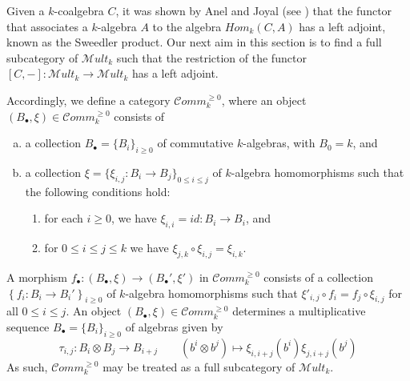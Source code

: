 \documentclass[10pt, colorlinks]{article}
\numberwithin{equation}{section} \DeclareMathSizes{2}{10}{12}{13}
\begin{document}
\smallskip


Given a $k$-coalgebra $C$, it was shown by Anel and Joyal (see \cite[Proposition 3.4.3]{AJ}) that the functor that associates a $k$-algebra $A$ to the algebra 
$Hom_k(C,A)$ has a left adjoint, known as the Sweedler product. Our next aim in this section is to find a full subcategory of $\mathscr Mult_k$ such that the restriction of the functor $[C,-]:\mathscr Mult_k\longrightarrow \mathscr Mult_k$ has a left adjoint.

\smallskip

Accordingly, we define a category $\mathcal Comm_k^{\geq 0}$, where an object $(B_\bullet,\xi)\in \mathcal Comm_k^{\geq 0}$ consists of 
\begin{enumerate}[(a)]
    \item a collection $B_\bullet=\{B_i\}_{i\geq 0}$ of commutative $k$-algebras, with $B_0=k$, and
    \item a collection $\xi=\{\xi_{i,j}:B_i\longrightarrow B_j\}_{0\leq i\leq j}$ of $k$-algebra homomorphisms such that the following conditions hold:
    \begin{enumerate} 
        \item[(i)] for each $i\geq 0$, we have $\xi_{i,i}=id:B_i\longrightarrow B_i$, and
        \item[(ii)] for  $0\leq i\leq j\leq k$ we have $\xi_{j,k}\circ \xi_{i,j}=\xi_{i,k}$.
    \end{enumerate}
\end{enumerate}



A morphism $f_\bullet:(B_\bullet,\xi)\longrightarrow (B_\bullet',\xi')$ in $\mathcal Comm_k^{\geq 0}$  consists of a collection $\left\{f_i:B_i\longrightarrow B_i'\right\}_{i\geq 0}$ of $k$-algebra homomorphisms  such that $\xi'_{i,j}\circ f_i=f_j\circ \xi_{i,j}$ for all $0\leq i\leq j$. An object $(B_\bullet,\xi)\in \mathcal Comm_k^{\geq 0}$ determines a multiplicative sequence
$B_\bullet=\{B_i\}_{i\geq 0}$  of algebras given by
\begin{equation}\label{pi3r}
    \tau_{i,j}:B_i\otimes B_j\longrightarrow B_{i+j}\qquad (b^i\otimes b^j)\longmapsto \xi_{i,i+j}(b^i)\xi_{j,i+j}(b^j)
\end{equation} As such, $\mathcal Comm_k^{\geq 0}$ may be treated as a full subcategory of $\mathscr Mult_k$.
\end{document}
